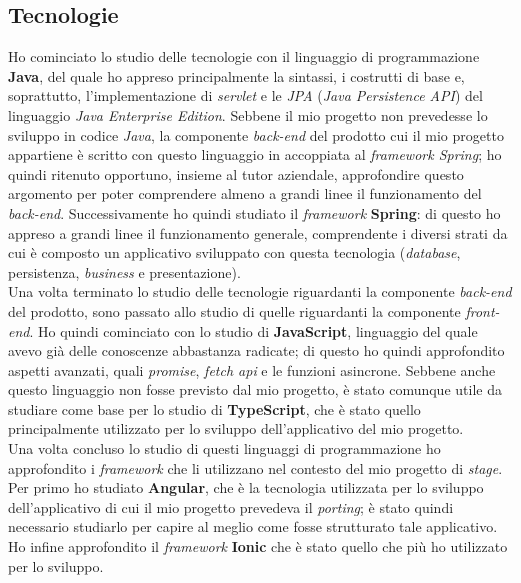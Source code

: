\subsection{Tecnologie}
Ho cominciato lo studio delle tecnologie con il linguaggio di programmazione \textbf{Java}, del quale ho appreso principalmente la sintassi, i costrutti di base e, soprattutto, l'implementazione di \textit{servlet} e le \textit{JPA} (\textit{Java Persistence API}) del linguaggio \textit{Java Enterprise Edition}. Sebbene il mio progetto non prevedesse lo sviluppo in codice \textit{Java}, la componente \textit{back-end} del prodotto cui il mio progetto appartiene è scritto con questo linguaggio in accoppiata al \textit{framework Spring}; ho quindi ritenuto opportuno, insieme al tutor aziendale, approfondire questo argomento per poter comprendere almeno a grandi linee il funzionamento del \textit{back-end}. Successivamente ho quindi studiato il \textit{framework} \textbf{Spring}: di questo ho appreso a grandi linee il funzionamento generale, comprendente i diversi strati da cui è composto un applicativo sviluppato con questa tecnologia (\textit{database}, persistenza, \textit{business} e presentazione). \\
Una volta terminato lo studio delle tecnologie riguardanti la componente \textit{back-end} del prodotto, sono passato allo studio di quelle riguardanti la componente \textit{front-end}. Ho quindi cominciato con lo studio di \textbf{JavaScript}, linguaggio del quale avevo già delle conoscenze abbastanza radicate; di questo ho quindi approfondito aspetti avanzati, quali \textit{promise}, \textit{fetch api} e le funzioni asincrone. Sebbene anche questo linguaggio non fosse previsto dal mio progetto, è stato comunque utile da studiare come base per lo studio di \textbf{TypeScript}, che è stato quello principalmente utilizzato per lo sviluppo dell'applicativo del mio progetto. \\
Una volta concluso lo studio di questi linguaggi di programmazione ho approfondito i \textit{framework} che li utilizzano nel contesto del mio progetto di \textit{stage}. Per primo ho studiato \textbf{Angular}, che è la tecnologia utilizzata per lo sviluppo dell'applicativo di cui il mio progetto prevedeva il \textit{porting}; è stato quindi necessario studiarlo per capire al meglio come fosse strutturato tale applicativo. Ho infine approfondito il \textit{framework} \textbf{Ionic} che è stato quello che più ho utilizzato per lo sviluppo. \\

